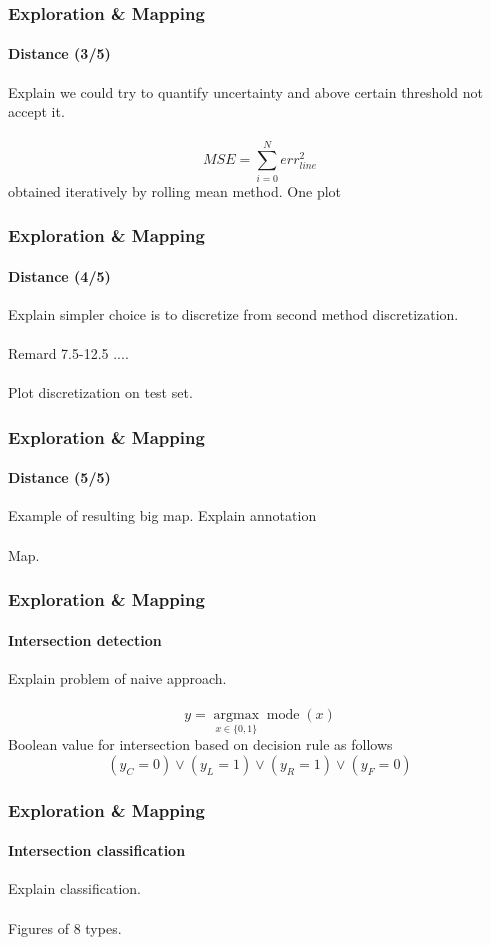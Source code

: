 \documentclass{beamer}
\begin{document}
\begin{frame}
\frametitle{Exploration \& Mapping}
\framesubtitle{Distance (3/5)}
Explain we could try to quantify uncertainty and above certain threshold not accept it.\\~\\
$$
	MSE = \sum_{i=0}^N err_{line}^2
$$
obtained iteratively by rolling mean method.
One plot 
\end{frame}


\begin{frame}
\frametitle{Exploration \& Mapping}
\framesubtitle{Distance (4/5)}
Explain simpler choice is to discretize from second method discretization.\\~\\
Remard 7.5-12.5 ....\\~\\
Plot discretization on test set.
\end{frame}


\begin{frame}
\frametitle{Exploration \& Mapping}
\framesubtitle{Distance (5/5)}
Example of resulting big map. Explain annotation\\~\\
Map.
\end{frame}


\begin{frame}
\frametitle{Exploration \& Mapping}
\framesubtitle{Intersection detection}
Explain problem of naive approach.\\~\\
$$
y = \underset{x \in  \{0,1\}}{\operatorname{argmax}} \operatorname{mode}(x)
$$
Boolean value for intersection based on decision rule as follows
$$
(y_C = 0) \lor (y_L = 1) \lor (y_R = 1) \lor (y_F = 0) 
$$
\end{frame}


\begin{frame}
\frametitle{Exploration \& Mapping}
\framesubtitle{Intersection classification}
Explain classification.\\~\\
Figures of 8 types.\\~\\
\end{frame}
\end{document}
